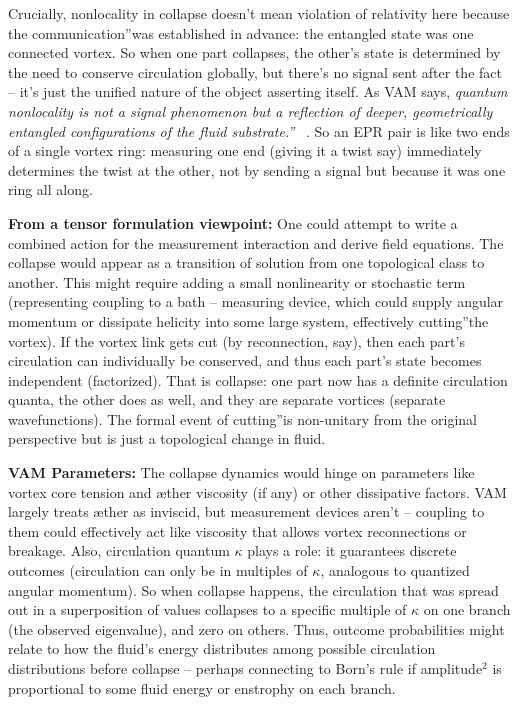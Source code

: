 \documentclass[a4paper, aps,preprint,superscriptaddress, 12pt]{revtex4}
\begin{document}
Crucially, nonlocality in collapse doesn't mean violation of relativity here because the \grqq communication\textquotedblright was established in advance: the entangled state was one connected vortex. So when one part collapses, the other's state is determined by the need to conserve circulation globally, but there's no signal sent after the fact – it's just the unified nature of the object asserting itself. As VAM says, \textit{\grqq quantum nonlocality is not a signal phenomenon but a reflection of deeper, geometrically entangled configurations of the fluid substrate.\textquotedblright}~\cite{Iskandarani2025c} . So an EPR pair is like two ends of a single vortex ring: measuring one end (giving it a twist say) immediately determines the twist at the other, not by sending a signal but because it was one ring all along.


\textbf{From a tensor formulation viewpoint:} One could attempt to write a combined action for the measurement interaction and derive field equations. The collapse would appear as a transition of solution from one topological class to another. This might require adding a small nonlinearity or stochastic term (representing coupling to a bath – measuring device, which could supply angular momentum or dissipate helicity into some large system, effectively \grqq cutting\textquotedblright the vortex). If the vortex link gets cut (by reconnection, say), then each part's circulation can individually be conserved, and thus each part's state becomes independent (factorized). That is collapse: one part now has a definite circulation quanta, the other does as well, and they are separate vortices (separate wavefunctions). The formal event of \grqq cutting\textquotedblright is non-unitary from the original perspective but is just a topological change in fluid.


\textbf{VAM Parameters:} The collapse dynamics would hinge on parameters like vortex core tension and æther viscosity (if any) or other dissipative factors. VAM largely treats æther as inviscid, but measurement devices aren't – coupling to them could effectively act like viscosity that allows vortex reconnections or breakage. Also, circulation quantum $\kappa$ plays a role: it guarantees discrete outcomes (circulation can only be in multiples of $\kappa$, analogous to quantized angular momentum). So when collapse happens, the circulation that was spread out in a superposition of values collapses to a specific multiple of $\kappa$ on one branch (the observed eigenvalue), and zero on others. Thus, outcome probabilities might relate to how the fluid's energy distributes among possible circulation distributions before collapse – perhaps connecting to Born's rule if amplitude$^2$ is proportional to some fluid energy or enstrophy on each branch.
\end{document}
